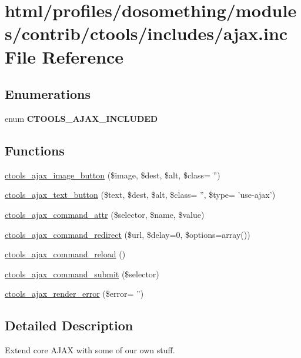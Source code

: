 \hypertarget{ctools_2includes_2ajax_8inc}{
\section{html/profiles/dosomething/modules/contrib/ctools/includes/ajax.inc File Reference}
\label{ctools_2includes_2ajax_8inc}
}
\subsection*{Enumerations}
\begin{DoxyCompactItemize}
\item 
enum {\bfseries CTOOLS\_\-AJAX\_\-INCLUDED} 
\end{DoxyCompactItemize}
\subsection*{Functions}
\begin{DoxyCompactItemize}
\item 
\hyperlink{ctools_2includes_2ajax_8inc_a00499a965fd0a192af2106a400c0e140}{ctools\_\-ajax\_\-image\_\-button} (\$image, \$dest, \$alt, \$class= '')
\item 
\hyperlink{ctools_2includes_2ajax_8inc_aa20aff28acfb85cc21e49727d3126aad}{ctools\_\-ajax\_\-text\_\-button} (\$text, \$dest, \$alt, \$class= '', \$type= 'use-\/ajax')
\item 
\hyperlink{ctools_2includes_2ajax_8inc_a598e0895893a1295ec95964a2a7e97d8}{ctools\_\-ajax\_\-command\_\-attr} (\$selector, \$name, \$value)
\item 
\hyperlink{ctools_2includes_2ajax_8inc_a5f3e0560404a0fbd02f118c1f7408e24}{ctools\_\-ajax\_\-command\_\-redirect} (\$url, \$delay=0, \$options=array())
\item 
\hyperlink{ctools_2includes_2ajax_8inc_abadcd3021f5a0dedff23944d40dbc1ae}{ctools\_\-ajax\_\-command\_\-reload} ()
\item 
\hyperlink{ctools_2includes_2ajax_8inc_a911fe17d610b49cdf90a6d3009bab2b6}{ctools\_\-ajax\_\-command\_\-submit} (\$selector)
\item 
\hyperlink{ctools_2includes_2ajax_8inc_ab41cb38da1e7523e8697f9197cc6244e}{ctools\_\-ajax\_\-render\_\-error} (\$error= '')
\end{DoxyCompactItemize}


\subsection{Detailed Description}
Extend core AJAX with some of our own stuff. 

